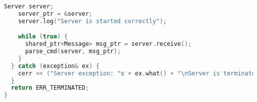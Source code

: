 \begin{lstlisting}[language=C++]
    Server server;
    server_ptr = &server;
    server.log("Server is started correctly");

    while (true) {
      shared_ptr<Message> msg_ptr = server.receive();
      parse_cmd(server, msg_ptr);
    }
  } catch (exception& ex) {
    cerr << ("Server exception: "s + ex.what() + "\nServer is terminated by exception");
  }
  return ERR_TERMINATED;
}


\end{lstlisting}

\pagebreak